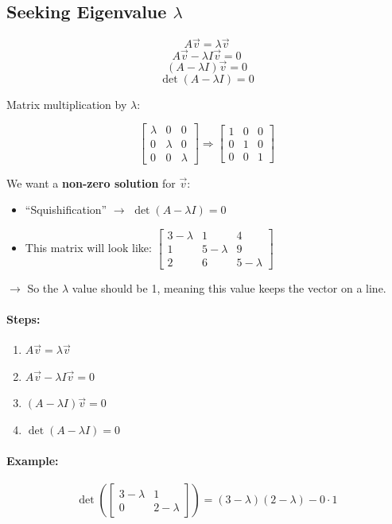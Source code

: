 \subsection{Seeking Eigenvalue $\lambda$}

\[
A\vec{v} = \lambda\vec{v}
\]
\[
A\vec{v} - \lambda I\vec{v} = 0
\]
\[
(A - \lambda I)\vec{v} = 0
\]
\[
\det(A - \lambda I) = 0
\]

Matrix multiplication by $\lambda$:

\[
\begin{bmatrix} \lambda & 0 & 0 \\ 0 & \lambda & 0 \\ 0 & 0 & \lambda \end{bmatrix}
\Rightarrow
\begin{bmatrix} 1 & 0 & 0 \\ 0 & 1 & 0 \\ 0 & 0 & 1 \end{bmatrix}
\]

We want a \textbf{non-zero solution} for $\vec{v}$:
\begin{itemize}[nosep]
  \item ``Squishification'' $\rightarrow$ $\det(A - \lambda I) = 0$
  \item This matrix will look like: $\begin{bmatrix} 3-\lambda & 1 & 4 \\ 1 & 5-\lambda & 9 \\ 2 & 6 & 5-\lambda \end{bmatrix}$
\end{itemize}

$\rightarrow$ So the $\lambda$ value should be 1, meaning this value keeps the vector on a line.

\paragraph{Steps:}
\begin{enumerate}[nosep]
  \item $A\vec{v} = \lambda\vec{v}$
  \item $A\vec{v} - \lambda I\vec{v} = 0$
  \item $(A - \lambda I)\vec{v} = 0$
  \item $\det(A - \lambda I) = 0$
\end{enumerate}

\paragraph{Example:}
\[
\det\left(\begin{bmatrix} 3-\lambda & 1 \\ 0 & 2-\lambda \end{bmatrix}\right) = (3-\lambda)(2-\lambda) - 0 \cdot 1
\]

